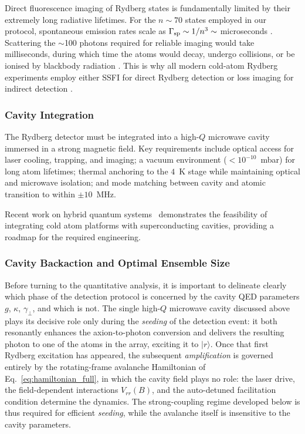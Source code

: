 Direct fluorescence imaging of Rydberg states is fundamentally limited by their extremely long radiative lifetimes. For the $n \sim 70$ states employed in our protocol, spontaneous emission rates scale as $\Gamma_{\rm sp} \sim 1/n^3 \sim$ microseconds \cite{Gallagher2005}. Scattering the $\sim$100 photons required for reliable imaging would take milliseconds, during which time the atoms would decay, undergo collisions, or be ionised by blackbody radiation \cite{Beterov2009}. This is why all modern cold-atom Rydberg experiments employ either SSFI for direct Rydberg detection or loss imaging for indirect detection \cite{Saffman2016, Zhang2024Review}.

\subsubsection{Cavity Integration}

The Rydberg detector must be integrated into a high-$Q$ microwave cavity immersed in a strong magnetic field. Key requirements include optical access for laser cooling, trapping, and imaging; a vacuum environment ($< 10^{-10}$~mbar) for long atom lifetimes; thermal anchoring to the $4$~K stage while maintaining optical and microwave isolation; and mode matching between cavity and atomic transition to within $\pm 10$~MHz.

Recent work on hybrid quantum systems~\cite{Hogan2012,Hermann2014} demonstrates the feasibility of integrating cold atom platforms with superconducting cavities, providing a roadmap for the required engineering.

\subsubsection{Cavity Backaction and Optimal Ensemble Size}
\label{sec:backaction}

Before turning to the quantitative analysis, it is important to delineate clearly which phase of the detection protocol is concerned by the cavity QED parameters $g$, $\kappa$, $\gamma_\perp$, and which is not. The single high-$Q$ microwave cavity discussed above plays its decisive role only during the \emph{seeding} of the detection event: it both resonantly enhances the axion-to-photon conversion and delivers the resulting photon to one of the atoms in the array, exciting it to $|r\rangle$. Once that first Rydberg excitation has appeared, the subsequent \emph{amplification} is governed entirely by the rotating-frame avalanche Hamiltonian of Eq.~\eqref{eq:hamiltonian_full}, in which the cavity field plays no role: the laser drive, the field-dependent interactions $V_{rr}(B)$, and the auto-detuned facilitation condition determine the dynamics. The strong-coupling regime developed below is thus required for efficient \emph{seeding}, while the avalanche itself is insensitive to the cavity parameters.

